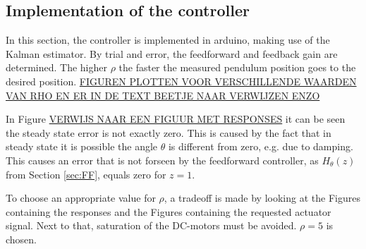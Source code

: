 \documentclass[a4paper,kul]{kulakarticle} %
\begin{document}
\subsection{Implementation of the controller}
\label{sec:implFBcontr}
In this section, the controller is implemented in arduino, making use of the Kalman estimator. By trial and error, the feedforward and feedback gain are determined. The higher $\rho$ the faster the measured pendulum position goes to the desired position.  
\underline{FIGUREN PLOTTEN VOOR VERSCHILLENDE WAARDEN VAN RHO EN ER IN DE TEXT BEETJE NAAR VERWIJZEN ENZO}

In Figure \underline{VERWIJS NAAR EEN FIGUUR MET RESPONSES} it can be seen the steady state error is not exactly zero. This is caused by the fact that in steady state it is possible the angle $\theta$ is different from zero, e.g. due to damping. This causes an error that is not forseen by the feedforward controller, as $H_{\theta}(z)$ from Section \ref{sec:FF}, equals zero for $z = 1$. 

To choose an appropriate value for $\rho$, a tradeoff is made by looking at the Figures containing the responses and the Figures containing the requested actuator signal. Next to that, saturation of the DC-motors must be avoided. $\rho = 5$ is chosen. 






	
\end{document}
